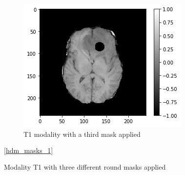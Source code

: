 \begin{figure}[H]
    \begin{subfigure}[t]{.33\textwidth}
        \centering
        \includegraphics[width=\linewidth]{chapters/06_hdm/images_masked/masked_8.png}
        \caption{T1 modality with a third mask applied}
    \end{subfigure}
    \caption{Modality T1 with three different round masks applied}
    \ref{hdm_masks_1}
\end{figure}

